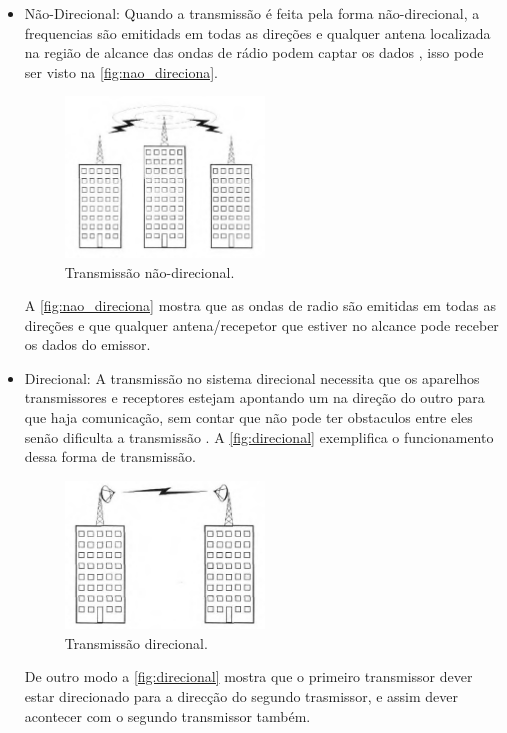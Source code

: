         \begin{itemize}
        \item{Não-Direcional: }
        Quando a transmissão é feita pela forma não-direcional, a frequencias são emitidads em todas as direções e qualquer antena localizada na região de alcance das ondas de rádio podem captar os dados \cite{torres2001}, isso pode ser visto na \autoref{fig:nao_direciona}.
            \begin{figure}[H]
              \caption{\label{fig:nao_direciona}{Transmissão não-direcional.}}
              \centering
              \includegraphics[width=0.5\textwidth]{Figuras/transmissao_radio_nao_direcional.PNG}
            \end{figure}
        \par
        A  \autoref{fig:nao_direciona} mostra que as ondas de radio são emitidas em todas as direções e que qualquer antena/recepetor que estiver no alcance pode receber os dados do emissor.
        
        \item{Direcional: }
        A transmissão no sistema direcional necessita que os aparelhos transmissores e receptores estejam apontando um na direção do outro para que haja comunicação, sem contar que não pode ter obstaculos entre eles senão dificulta a transmissão \cite{torres2001}. A \autoref{fig:direcional} exemplifica o funcionamento dessa forma de transmissão.

        \begin{figure}[H]
              \caption{\label{fig:direcional}{Transmissão direcional.}}
              \centering
              \includegraphics[width=0.5\textwidth]{Figuras/transmissao_radio_direcional.PNG}
        \end{figure}
        \par
        De outro modo a \autoref{fig:direcional} mostra que o primeiro transmissor dever estar direcionado para a direcção do segundo trasmissor, e assim dever acontecer com o segundo transmissor também.
        \end{itemize}    
